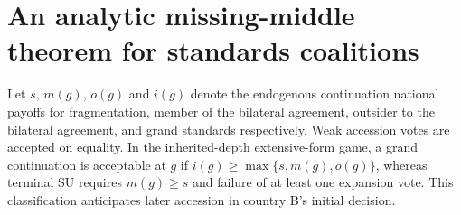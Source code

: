 \section{An analytic missing-middle theorem for standards coalitions}
\label{sec:missing-middle}

Let $s$, $m(g)$, $o(g)$ and $i(g)$ denote the endogenous
continuation national payoffs for fragmentation, member of the
bilateral agreement, outsider to the bilateral agreement,
and grand standards respectively. Weak accession votes are
accepted on equality. In the inherited-depth extensive-form
game, a grand continuation is acceptable at $g$ if
$i(g)\ge\max\{s,m(g),o(g)\}$, whereas terminal SU requires
$m(g)\ge s$ and failure of at least one expansion vote.
This classification anticipates later accession in country B's
initial decision.

